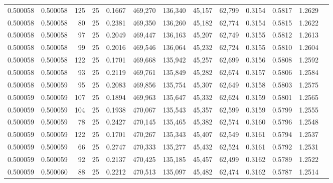 \begin{tabular}{rrrrrrrrrrrrr}
0.500058 & 0.500058 &   125 &  25 &                                     0.1667 & 469,270 & 136,340 &  45,157 &  62,799 & 0.3154 & 0.5817 & 1.2629 \\
0.500058 & 0.500058 &    80 &  25 &                                     0.2381 & 469,350 & 136,260 &  45,182 &  62,774 & 0.3154 & 0.5815 & 1.2622 \\
0.500058 & 0.500058 &    97 &  25 &                                     0.2049 & 469,447 & 136,163 &  45,207 &  62,749 & 0.3155 & 0.5812 & 1.2613 \\
0.500058 & 0.500058 &    99 &  25 &                                     0.2016 & 469,546 & 136,064 &  45,232 &  62,724 & 0.3155 & 0.5810 & 1.2604 \\
0.500058 & 0.500058 &   122 &  25 &                                     0.1701 & 469,668 & 135,942 &  45,257 &  62,699 & 0.3156 & 0.5808 & 1.2592 \\
0.500058 & 0.500058 &    93 &  25 &                                     0.2119 & 469,761 & 135,849 &  45,282 &  62,674 & 0.3157 & 0.5806 & 1.2584 \\
0.500058 & 0.500059 &    95 &  25 &                                     0.2083 & 469,856 & 135,754 &  45,307 &  62,649 & 0.3158 & 0.5803 & 1.2575 \\
0.500059 & 0.500059 &   107 &  25 &                                     0.1894 & 469,963 & 135,647 &  45,332 &  62,624 & 0.3159 & 0.5801 & 1.2565 \\
0.500059 & 0.500059 &   104 &  25 &                                     0.1938 & 470,067 & 135,543 &  45,357 &  62,599 & 0.3159 & 0.5799 & 1.2555 \\
0.500059 & 0.500059 &    78 &  25 &                                     0.2427 & 470,145 & 135,465 &  45,382 &  62,574 & 0.3160 & 0.5796 & 1.2548 \\
0.500059 & 0.500059 &   122 &  25 &                                     0.1701 & 470,267 & 135,343 &  45,407 &  62,549 & 0.3161 & 0.5794 & 1.2537 \\
0.500059 & 0.500059 &    66 &  25 &                                     0.2747 & 470,333 & 135,277 &  45,432 &  62,524 & 0.3161 & 0.5792 & 1.2531 \\
0.500059 & 0.500059 &    92 &  25 &                                     0.2137 & 470,425 & 135,185 &  45,457 &  62,499 & 0.3162 & 0.5789 & 1.2522 \\
0.500059 & 0.500060 &    88 &  25 &                                     0.2212 & 470,513 & 135,097 &  45,482 &  62,474 & 0.3162 & 0.5787 & 1.2514 \\

\end{tabular}
